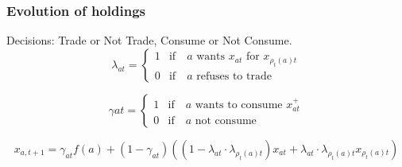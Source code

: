 \begin{frame}
    \frametitle{Evolution of holdings}

    Decisions: Trade or Not Trade, Consume or Not Consume.
    \begin{equation}
        \lambda_{at} = \begin{cases}
            1 & \text{if} \quad a \text{ wants } x_{at} \text{ for } x_{\rho_t(a)t} \\
            0 & \text{if} \quad a \text{ refuses to trade}
        \end{cases}
    \end{equation}

    \setcounter{equation}{2}

    \begin{equation}
        \gamma{at} = \begin{cases}
            1 & \text{if} \quad a \text{ wants to consume } x_{at}^+ \\
            0 & \text{if} \quad a \text{ not consume}
        \end{cases}
    \end{equation}

    \begin{equation}
        \label{eq:x-lom}
        x_{a, t+1} = \gamma_{at} f(a) + (1-\gamma_{at})\left(
            (1-\lambda_{at} \cdot \lambda_{\rho_t(a)t})x_{at} 
            + \lambda_{at} \cdot \lambda_{\rho_t(a)t} x_{\rho_t(a)t}
        \right)
    \end{equation}

\end{frame}
